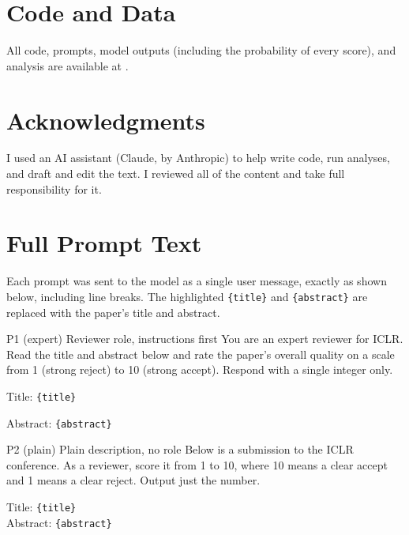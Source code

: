 \documentclass[11pt]{article}
\newcommand{\slot}[1]{\textcolor{blue!55!black}{\texttt{\{#1\}}}}
\newif\ifanonymous
\newcommand{\fillme}[1]{\textcolor{red}{[#1]}}
\begin{document}
\section*{Code and Data}
All code, prompts, model outputs (including the probability of every score), and analysis are available at \ifanonymous \fillme{anonymized repository link}\else {}\fi.

\section*{Acknowledgments}
I used an AI assistant (Claude, by Anthropic) to help write code, run analyses, and draft and edit the text. I reviewed all of the content and take full responsibility for it.




\clearpage
\appendix

\section{Full Prompt Text}
\label{app:prompts}
Each prompt was sent to the model as a single user message, exactly as shown below, including line breaks. The highlighted \slot{title} and \slot{abstract} are replaced with the paper's title and abstract.

\begin{promptbox}{P1 (expert) \hfill\normalfont\small Reviewer role, instructions first}
You are an expert reviewer for ICLR. Read the title and abstract below and rate the paper's overall quality on a scale from 1 (strong reject) to 10 (strong accept). Respond with a single integer only.\par
Title: \slot{title}\par
Abstract: \slot{abstract}
\end{promptbox}

\begin{promptbox}{P2 (plain) \hfill\normalfont\small Plain description, no role}
Below is a submission to the ICLR conference. As a reviewer, score it from 1 to 10, where 10 means a clear accept and 1 means a clear reject. Output just the number.\par
Title: \slot{title}\\
Abstract: \slot{abstract}
\end{promptbox}
\end{document}
